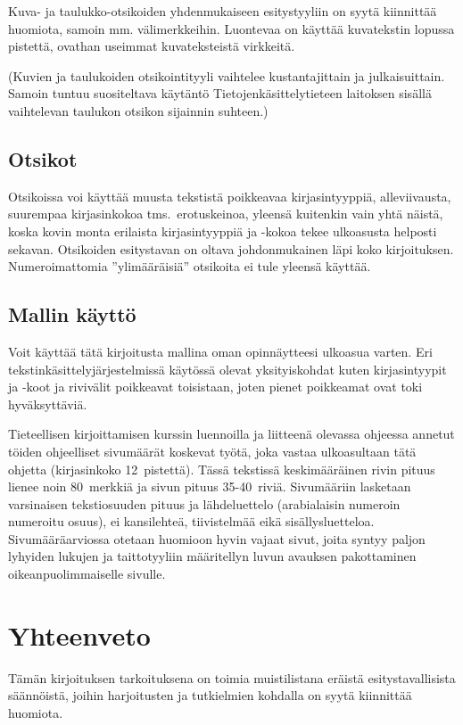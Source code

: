 Kuva- ja taulukko-otsikoiden yhdenmukaiseen esitystyyliin on syytä kiinnittää
huomiota, samoin mm. välimerkkeihin. Luontevaa on käyttää
kuvatekstin lopussa pistettä, ovathan useimmat kuvateksteistä virkkeitä. 

(Kuvien ja taulukoiden otsikointityyli vaihtelee
kustantajittain ja julkaisuittain. Samoin tuntuu suositeltava käytäntö
Tietojenkäsittelytieteen laitoksen sisällä vaihtelevan taulukon
otsikon sijainnin suhteen.)


\section{Otsikot}

Otsikoissa voi käyttää muusta tekstistä poikkeavaa kirjasintyyppiä,
alleviivausta, suurempaa kirjasinkokoa tms.\ erotuskeinoa, yleensä
kuitenkin vain yhtä näistä, koska kovin monta erilaista kirjasintyyppiä
ja -kokoa tekee ulkoasusta helposti sekavan.  Otsikoiden esitystavan on
oltava johdonmukainen läpi koko kirjoituksen. Numeroimattomia
''ylimääräisiä'' otsikoita ei tule yleensä käyttää.


\section{Mallin käyttö}

Voit käyttää tätä kirjoitusta mallina oman opinnäytteesi ulkoasua
varten. Eri tekstinkäsittelyjärjestelmissä käytössä olevat yksityiskohdat kuten
kirjasintyypit ja -koot ja rivivälit  poikkeavat toisistaan, joten
pienet poikkeamat ovat toki hyväksyttäviä.

Tieteellisen kirjoittamisen kurssin luennoilla ja
liitteenä olevassa ohjeessa annetut töiden ohjeelliset sivumäärät
koskevat työtä, joka vastaa ulkoasultaan tätä ohjetta (kirjasinkoko
12~pistettä). Tässä tekstissä keskimääräinen rivin pituus lienee noin
80~merkkiä ja sivun pituus 35-40~riviä.
Sivumääriin lasketaan varsinaisen tekstiosuuden pituus ja lähdeluettelo
(arabialaisin numeroin numeroitu osuus), ei kansilehteä, tiivistelmää
eikä sisällysluetteloa. Sivumääräarviossa otetaan huomioon hyvin vajaat
sivut, joita syntyy paljon lyhyiden lukujen ja taittotyyliin määritellyn
luvun avauksen pakottaminen oikeanpuolimmaiselle sivulle. 

\chapter{Yhteenveto}

Tämän kirjoituksen tarkoituksena on toimia muistilistana eräistä
esitystavallisista säännöistä, joihin harjoitusten ja tutkielmien
kohdalla on syytä kiinnittää huomiota.

